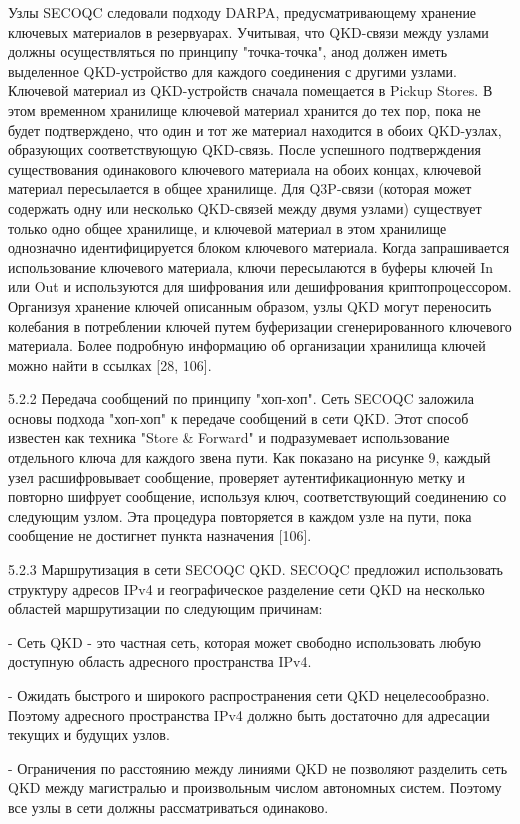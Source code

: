 Узлы SECOQC следовали подходу DARPA, предусматривающему хранение ключевых материалов в резервуарах. Учитывая, что QKD-связи между узлами должны осуществляться по принципу "точка-точка", анод должен иметь выделенное QKD-устройство для каждого соединения с другими узлами. Ключевой материал из QKD-устройств сначала помещается в Pickup Stores. В этом временном хранилище ключевой материал хранится до тех пор, пока не будет подтверждено, что один и тот же материал находится в обоих QKD-узлах, образующих соответствующую QKD-связь. После успешного подтверждения существования одинакового ключевого материала на обоих концах, ключевой материал пересылается в общее хранилище. Для Q3P-связи (которая может содержать одну или несколько QKD-связей между двумя узлами) существует только одно общее хранилище, и ключевой материал в этом хранилище однозначно идентифицируется блоком ключевого материала. Когда запрашивается использование ключевого материала, ключи пересылаются в буферы ключей In или Out и используются для шифрования или дешифрования криптопроцессором. Организуя хранение ключей описанным образом, узлы QKD могут переносить колебания в потреблении ключей путем буферизации сгенерированного ключевого материала. Более подробную информацию об организации хранилища ключей можно найти в ссылках [28, 106].

5.2.2 Передача сообщений по принципу "хоп-хоп". Сеть SECOQC заложила основы подхода "хоп-хоп" к передаче сообщений в сети QKD. Этот способ известен как техника "Store \& Forward" и подразумевает использование отдельного ключа для каждого звена пути. Как показано на рисунке 9, каждый узел расшифровывает сообщение, проверяет аутентификационную метку и повторно шифрует сообщение, используя ключ, соответствующий соединению со следующим узлом. Эта процедура повторяется в каждом узле на пути, пока сообщение не достигнет пункта назначения [106].


5.2.3 Маршрутизация в сети SECOQC QKD. SECOQC предложил использовать структуру адресов IPv4 и географическое разделение сети QKD на несколько областей маршрутизации по следующим причинам:

- Сеть QKD - это частная сеть, которая может свободно использовать любую доступную область адресного пространства IPv4.

- Ожидать быстрого и широкого распространения сети QKD нецелесообразно. Поэтому адресного пространства IPv4 должно быть достаточно для адресации текущих и будущих узлов.

- Ограничения по расстоянию между линиями QKD не позволяют разделить сеть QKD между магистралью и произвольным числом автономных систем. Поэтому все узлы в сети должны рассматриваться одинаково.

